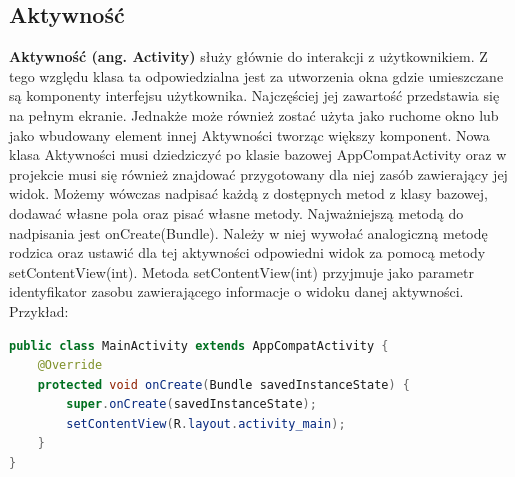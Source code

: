\subsection{Aktywność}
\textbf{Aktywność (ang. Activity)} służy głównie do interakcji z użytkownikiem. Z tego względu klasa ta odpowiedzialna jest za utworzenia okna gdzie umieszczane są komponenty interfejsu użytkownika. Najczęściej jej zawartość przedstawia się na pełnym ekranie. Jednakże może również zostać użyta jako ruchome okno lub jako wbudowany element innej Aktywności tworząc większy komponent. Nowa klasa Aktywności musi dziedziczyć po klasie bazowej AppCompatActivity oraz w projekcie musi się również znajdować przygotowany dla niej zasób zawierający jej widok. Możemy wówczas nadpisać każdą z dostępnych metod z klasy bazowej, dodawać własne pola oraz pisać własne metody. Najważniejszą metodą do nadpisania jest onCreate(Bundle). Należy w niej wywołać analogiczną metodę rodzica oraz ustawić dla tej aktywności odpowiedni widok za pomocą metody setContentView(int). Metoda setContentView(int) przyjmuje jako parametr identyfikator zasobu zawierającego informacje o widoku danej aktywności.\cite{activity} Przykład:
\begin{lstlisting}[language=Java]
public class MainActivity extends AppCompatActivity {
    @Override
    protected void onCreate(Bundle savedInstanceState) {
        super.onCreate(savedInstanceState);
        setContentView(R.layout.activity_main);
    }
}
\end{lstlisting}
